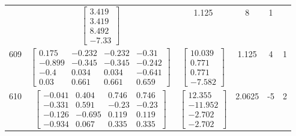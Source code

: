 \documentclass[a4paper,12pt]{article}
\begin{document}
\begin{tabular}{c c c c c c}
&
$\begin{bmatrix} 3.419 \\ 3.419 \\ 8.492 \\ -7.33 \end{bmatrix}$
&
1.125
&
8
&
1
\\
609
&
$\begin{bmatrix} 0.175 & -0.232 & -0.232 & -0.31 \\ -0.899 & -0.345 & -0.345 & -0.242 \\ -0.4 & 0.034 & 0.034 & -0.641 \\ 0.03 & 0.661 & 0.661 & 0.659 \end{bmatrix}$
&
$\begin{bmatrix} 10.039 \\ 0.771 \\ 0.771 \\ -7.582 \end{bmatrix}$
&
1.125
&
4
&
1
\\
610
&
$\begin{bmatrix} -0.041 & 0.404 & 0.746 & 0.746 \\ -0.331 & 0.591 & -0.23 & -0.23 \\ -0.126 & -0.695 & 0.119 & 0.119 \\ -0.934 & 0.067 & 0.335 & 0.335 \end{bmatrix}$
&
$\begin{bmatrix} 12.355 \\ -11.952 \\ -2.702 \\ -2.702 \end{bmatrix}$
&
2.0625
&
-5
&
2
\\
\end{tabular} \egroup \newpage
\end{document}
